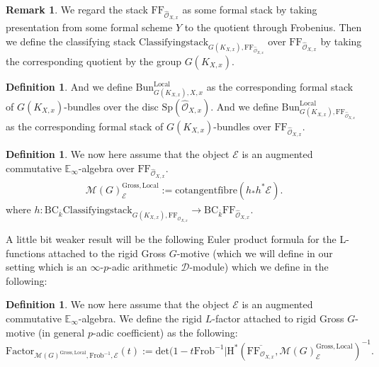 \documentclass[11pt]{book}
\theoremstyle{definition}
\newtheorem{definition}[theorem]{Definition}
\newtheorem{remark}[theorem]{Remark}
\numberwithin{equation}{section}
\begin{document}
\begin{remark}
We regard the stack $\mathrm{FF}_{\widehat{\mathcal{O}}_{X,x}}$ as some formal stack by taking presentation from some formal scheme $Y$ to the quotient through Frobenius. Then we define the classifying stack $\mathrm{Classifyingstack}_{G(K_{X,x}),\mathrm{FF}_{\widehat{\mathcal{O}}_{X,x}}}$ over $\mathrm{FF}_{\widehat{\mathcal{O}}_{X,x}}$ by taking the corresponding quotient by the group $G(K_{X,x})$.	
\end{remark}

\begin{definition}
And we define $\mathrm{Bun}^\mathrm{Local}_{G(K_{X,x}),X,x}$ as the corresponding formal stack of $G(K_{X,x})$-bundles over the disc $\mathrm{Sp}(\widehat{\mathcal{O}}_{X,x})$. And we define $\mathrm{Bun}^\mathrm{Local}_{G(K_{X,x}),\mathrm{FF}_{\widehat{\mathcal{O}}_{X,x}}}$ as the corresponding formal stack of $G(K_{X,x})$-bundles over $\mathrm{FF}_{\widehat{\mathcal{O}}_{X,x}}$.
\end{definition}



\begin{definition}
We now here assume that the object $\mathcal{E}$ is an augmented commutative $\mathbb{E}_\infty$-algebra over $\mathrm{FF}_{\widehat{\mathcal{O}}_{X,x}}$.
\begin{align}
\mathcal{M}(G)^\mathrm{Gross,Local}_\mathcal{E}:= \mathrm{cotangentfibre}(h_*h^*\mathcal{E}).	
\end{align}
where $h: \mathrm{BC}_{\overline{k}}\mathrm{Classifyingstack}_{G(K_{X,x}),\mathrm{FF}_{\widehat{\mathcal{O}}_{X,x}}} \rightarrow \mathrm{BC}_{\overline{k}}\mathrm{FF}_{\widehat{\mathcal{O}}_{X,x}}$.
\end{definition}


 A little bit weaker result will be the following Euler product formula for the L-functions attached to the rigid Gross $G$-motive (which we will define in our setting which is an $\infty$-$p$-adic arithmetic $\mathcal{D}$-module) which we define in the following:


\begin{definition}
We now here assume that the object $\mathcal{E}$ is an augmented commutative $\mathbb{E}_\infty$-algebra. We define the rigid $L$-factor attached to rigid Gross $G$-motive (in general $p$-adic coefficient) as the following:
\begin{displaymath}
\mathrm{Factor}_{\mathcal{M}(G)^\mathrm{Gross,Local},\mathrm{Frob}^{-1},\mathcal{E}}(t):=\mathrm{det}(1-t\mathrm{Frob}^{-1}|\mathrm{H}^*(\overline{\mathrm{FF}_{\mathcal{O}_{X,x}}},\mathcal{M}(G)^\mathrm{Gross,Local}_\mathcal{E})^{-1}.
\end{displaymath}
\end{definition}
\end{document}

